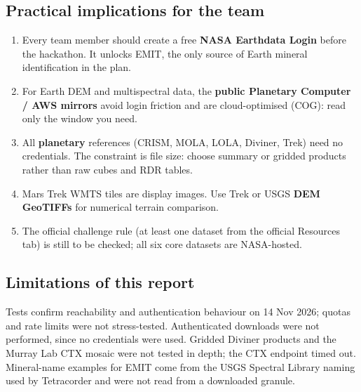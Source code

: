 \documentclass[10pt,a4paper]{article}
\begin{document}
\subsection{Practical implications for the team}
\begin{enumerate}
\item Every team member should create a free \textbf{NASA Earthdata Login} before the hackathon. It unlocks EMIT, the only source of Earth mineral identification in the plan.
\item For Earth DEM and multispectral data, the \textbf{public Planetary Computer / AWS mirrors} avoid login friction and are cloud-optimised (COG): read only the window you need.
\item All \textbf{planetary} references (CRISM, MOLA, LOLA, Diviner, Trek) need no credentials. The constraint is file size: choose summary or gridded products rather than raw cubes and RDR tables.
\item Mars Trek WMTS tiles are display images. Use Trek or USGS \textbf{DEM GeoTIFFs} for numerical terrain comparison.
\item The official challenge rule (at least one dataset from the official Resources tab) is still to be checked; all six core datasets are NASA-hosted.
\end{enumerate}

\subsection*{Limitations of this report}
Tests confirm reachability and authentication behaviour on 14 Nov 2026; quotas and rate limits were not stress-tested. Authenticated downloads were not performed, since no credentials were used. Gridded Diviner products and the Murray Lab CTX mosaic were not tested in depth; the CTX endpoint timed out. Mineral-name examples for EMIT come from the USGS Spectral Library naming used by Tetracorder and were not read from a downloaded granule.
\end{document}
